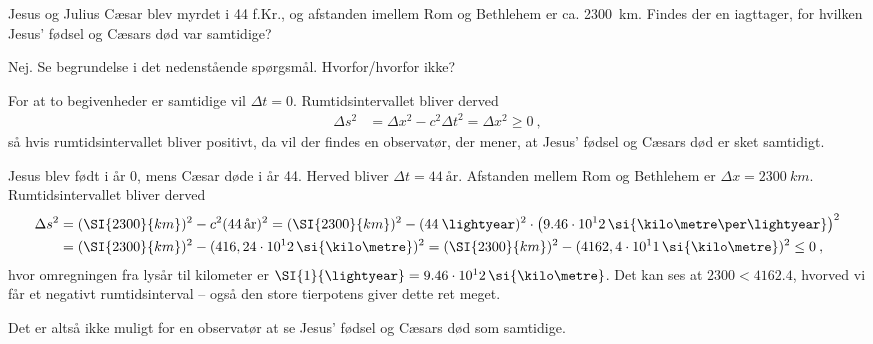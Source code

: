 \begin{opgave}{Jesus og Julius}
    Cæsar blev myrdet i 44 f.Kr., og afstanden imellem Rom og Bethlehem er ca. \SI{2300}{km}.
    \opg Findes der en iagttager, for hvilken Jesus' fødsel og Cæsars død var samtidige?
    
    Nej. Se begrundelse i det nedenstående spørgsmål.
    \opg Hvorfor/hvorfor ikke?
    
    For at to begivenheder er samtidige vil $\Delta t = 0$. Rumtidsintervallet bliver derved
    \begin{align}
        \Delta s^2 &= \Delta x^2 - c^2 \Delta t^2 = \Delta x^2 \geq 0 \: ,
    \end{align}
    så hvis rumtidsintervallet bliver positivt, da vil der findes en observatør, der mener, at Jesus' fødsel og Cæsars død er sket samtidigt.
    
    Jesus blev født i år 0, mens Cæsar døde i år 44. Herved bliver $\Delta t = 44 \: \text{år}$. Afstanden mellem Rom og Bethlehem er $\Delta x = \SI{2300}{km}$. Rumtidsintervallet bliver derved
    \begin{align}
        \Delta s^2 &= (\SI{2300}{km})^2 - c^2 (44 \, \text{år})^2
            = (\SI{2300}{km})^2 - (44 \: \text{\lightyear})^2 \cdot \left(9.46 \cdot 10^12 \, \si{\kilo\metre\per\lightyear}\right)^2 \nonumber\\
            &= (\SI{2300}{km})^2 - (416,24 \cdot 10^12 \, \si{\kilo\metre})^2
            = (\SI{2300}{km})^2 - (4162,4 \cdot 10^11 \, \si{\kilo\metre})^2
            \leq 0 \: ,
    \end{align}
    hvor omregningen fra lysår til kilometer er $\SI{1}{\lightyear} = 9.46 \cdot 10^12 \, \si{\kilo\metre}$. Det kan ses at $\num{2300} < \num{4162,4}$, hvorved vi får et negativt rumtidsinterval -- også den store tierpotens giver dette ret meget.
    
    Det er altså ikke muligt for en observatør at se Jesus' fødsel og Cæsars død som samtidige.
\end{opgave}

